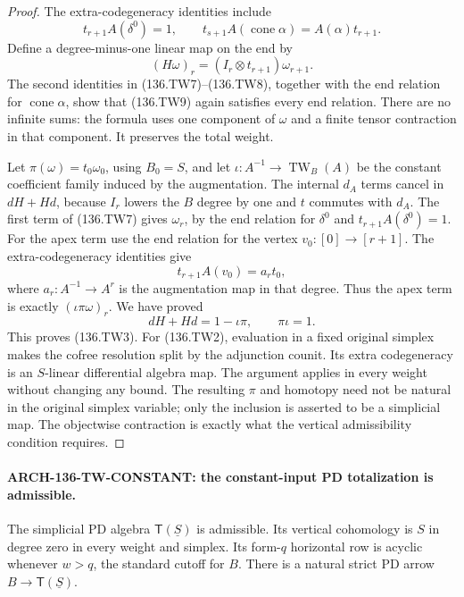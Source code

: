 \begin{proof}
The extra-codegeneracy identities include
\[
 t_{r+1}A(\delta^0)=1,
 \qquad
 t_{s+1}A(\operatorname{cone}\alpha)
                       =A(\alpha)t_{r+1}.
                                                               \tag{136.TW8}
\]
Define a degree-minus-one linear map on the end by
\[
                   (H\omega)_r=(I_r\otimes t_{r+1})\omega_{r+1}.
                                                               \tag{136.TW9}
\]
The second identities in (136.TW7)--(136.TW8), together
with the end relation for $\operatorname{cone}\alpha$,
show that (136.TW9) again satisfies every end relation.
There are no infinite sums: the formula uses one component
of $\omega$ and a finite tensor contraction in that component.
It preserves the total weight.

Let $\pi(\omega)=t_0\omega_0$, using $B_0=S$, and let
$\iota:A^{-1}\to\operatorname{TW}_B(A)$ be the constant
coefficient family induced by the augmentation. The
internal $d_A$ terms cancel in $dH+Hd$, because $I_r$
lowers the $B$ degree by one and $t$ commutes with $d_A$.
The first term of (136.TW7) gives $\omega_r$, by the
end relation for $\delta^0$ and $t_{r+1}A(\delta^0)=1$.
For the apex term use the end relation for the vertex
$v_0:[0]\to[r+1]$. The extra-codegeneracy identities give
\[
         t_{r+1}A(v_0)=a_r t_0,
\]
where $a_r:A^{-1}\to A^r$ is the augmentation map in
that degree. Thus the apex term is exactly
$(\iota\pi\omega)_r$. We have proved
\[
                    dH+Hd=1-\iota\pi,
                    \qquad \pi\iota=1.
\]
This proves (136.TW3). For (136.TW2), evaluation in a
fixed original simplex makes the cofree resolution split
by the adjunction counit. Its extra codegeneracy is an
$S$-linear differential algebra map. The argument applies
in every weight without changing any bound. The resulting
$\pi$ and homotopy need not be natural in the original
simplex variable; only the inclusion is asserted to be
a simplicial map. The objectwise contraction is exactly
what the vertical admissibility condition requires.
\end{proof}

\paragraph{ARCH-136-TW-CONSTANT: the constant-input PD totalization is admissible.}
The simplicial PD algebra $\mathsf T(\underline S)$ is
admissible. Its vertical cohomology is $S$ in degree
zero in every weight and simplex. Its form-$q$ horizontal
row is acyclic whenever $w>q$, the standard cutoff for
$B$. There is a natural strict PD arrow
$B\to\mathsf T(\underline S)$.

